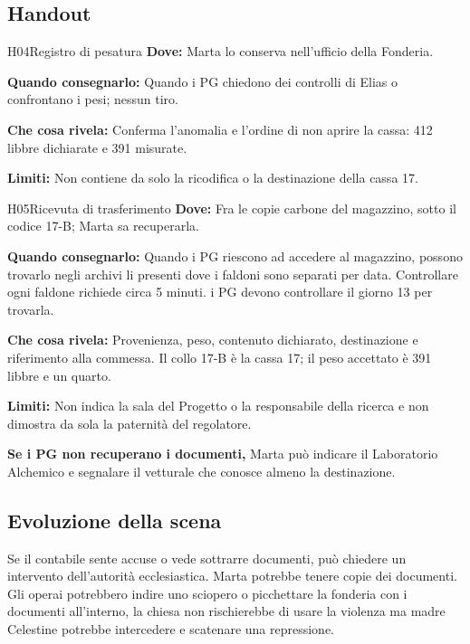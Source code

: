 \documentclass[11pt,a4paper]{article}
\begin{document}
\subsection{Handout}
\label{nodo-1-handout}
{}
\begin{handoutbox}{H04}{Registro di pesatura}
\textbf{Dove:} Marta lo conserva nell'ufficio della Fonderia.

\textbf{Quando consegnarlo:} Quando i PG chiedono dei controlli di Elias o confrontano i pesi; nessun tiro.

\textbf{Che cosa rivela:} Conferma l'anomalia e l'ordine di non aprire la cassa: 412 libbre dichiarate e 391 misurate.

\textbf{Limiti:} Non contiene da solo la ricodifica o la destinazione della cassa 17.
\end{handoutbox}

{}
\begin{handoutbox}{H05}{Ricevuta di trasferimento}
\textbf{Dove:} Fra le copie carbone del magazzino, sotto il codice 17-B; Marta sa recuperarla.

\textbf{Quando consegnarlo:} Quando i PG riescono ad accedere al magazzino, possono trovarlo negli archivi li presenti dove i faldoni sono separati per data. Controllare ogni faldone richiede circa 5 minuti. i PG devono controllare il giorno 13 per trovarla.

\textbf{Che cosa rivela:} Provenienza, peso, contenuto dichiarato, destinazione e riferimento alla commessa. Il collo 17-B è la cassa 17; il peso accettato è 391 libbre e un quarto.

\textbf{Limiti:} Non indica la sala del Progetto o la responsabile della ricerca e non dimostra da sola la paternità del regolatore.
\end{handoutbox}

\textbf{Se i PG non recuperano i documenti,} Marta può indicare il Laboratorio Alchemico e segnalare il vetturale che conosce almeno la destinazione.

\subsection{Evoluzione della scena}
\begin{clockbox}
Se il contabile sente accuse o vede sottrarre documenti, può chiedere un intervento dell'autorità ecclesiastica. Marta potrebbe tenere copie dei documenti. Gli operai potrebbero indire uno sciopero o picchettare la fonderia con i documenti all'interno, la chiesa non rischierebbe di usare la violenza ma madre Celestine potrebbe intercedere e scatenare una repressione.  
\end{clockbox}
\end{document}
